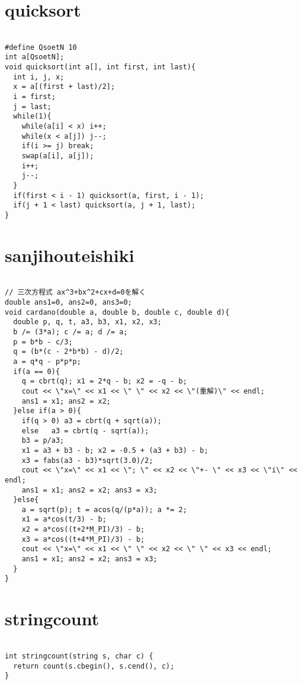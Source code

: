 \documentclass[a4j,titlepage]{jarticle} %
\begin{document}
\color{white}
\section{quicksort}
\color{black}
\begin{lstlisting}[caption=quicksort]

#define QsoetN 10
int a[QsoetN];
void quicksort(int a[], int first, int last){
  int i, j, x;
  x = a[(first + last)/2];
  i = first;
  j = last;
  while(1){
    while(a[i] < x) i++;
    while(x < a[j]) j--;
    if(i >= j) break;
    swap(a[i], a[j]);
    i++;
    j--;
  }
  if(first < i - 1) quicksort(a, first, i - 1);
  if(j + 1 < last) quicksort(a, j + 1, last);
}

\end{lstlisting}

\color{white}
\section{sanjihouteishiki}
\color{black}
\begin{lstlisting}[caption=sanjihouteishiki]

// 三次方程式 ax^3+bx^2+cx+d=0を解く 
double ans1=0, ans2=0, ans3=0;
void cardano(double a, double b, double c, double d){
  double p, q, t, a3, b3, x1, x2, x3;
  b /= (3*a); c /= a; d /= a;
  p = b*b - c/3;
  q = (b*(c - 2*b*b) - d)/2;
  a = q*q - p*p*p;
  if(a == 0){
    q = cbrt(q); x1 = 2*q - b; x2 = -q - b;
    cout << \"x=\" << x1 << \" \" << x2 << \"(重解)\" << endl;
    ans1 = x1; ans2 = x2;
  }else if(a > 0){
    if(q > 0) a3 = cbrt(q + sqrt(a));
    else   a3 = cbrt(q - sqrt(a));
    b3 = p/a3;
    x1 = a3 + b3 - b; x2 = -0.5 + (a3 + b3) - b;
    x3 = fabs(a3 - b3)*sqrt(3.0)/2;
    cout << \"x=\" << x1 << \"; \" << x2 << \"+- \" << x3 << \"i\" << endl;
    ans1 = x1; ans2 = x2; ans3 = x3;
  }else{
    a = sqrt(p); t = acos(q/(p*a)); a *= 2;
    x1 = a*cos(t/3) - b;
    x2 = a*cos((t+2*M_PI)/3) - b;
    x3 = a*cos((t+4*M_PI)/3) - b;
    cout << \"x=\" << x1 << \" \" << x2 << \" \" << x3 << endl;
    ans1 = x1; ans2 = x2; ans3 = x3;
  }
}

\end{lstlisting}

\color{white}
\section{stringcount}
\color{black}
\begin{lstlisting}[caption=stringcount]

int stringcount(string s, char c) {
  return count(s.cbegin(), s.cend(), c);
}

\end{lstlisting}
\end{document}
